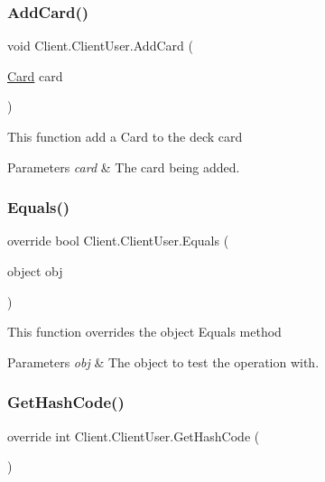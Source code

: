 \subsubsection{\texorpdfstring{Add\+Card()}{AddCard()}}
{\footnotesize\ttfamily void Client.\+Client\+User.\+Add\+Card (\begin{DoxyParamCaption}\item[{\hyperlink{class_game_1_1_card}{Card}}]{card }\end{DoxyParamCaption})\hspace{0.3cm}{\ttfamily [inline]}}

This function add a Card to the deck card 
\begin{DoxyParams}{Parameters}
{\em card} & The card being added. \\
\hline
\end{DoxyParams}
\mbox{\label{class_client_1_1_client_user_a515f5e58fe9f58abb63cfff6b9d399f1}} 
\subsubsection{\texorpdfstring{Equals()}{Equals()}}
{\footnotesize\ttfamily override bool Client.\+Client\+User.\+Equals (\begin{DoxyParamCaption}\item[{object}]{obj }\end{DoxyParamCaption})\hspace{0.3cm}{\ttfamily [inline]}}

This function overrides the object \textquotesingle{}Equals\textquotesingle{} method 
\begin{DoxyParams}{Parameters}
{\em obj} & The object to test the operation with. \\
\hline
\end{DoxyParams}
\mbox{\label{class_client_1_1_client_user_a1984c77d9a3444fdda847c6f8e4b1c93}} 
\subsubsection{\texorpdfstring{Get\+Hash\+Code()}{GetHashCode()}}
{\footnotesize\ttfamily override int Client.\+Client\+User.\+Get\+Hash\+Code (\begin{DoxyParamCaption}{ }\end{DoxyParamCaption})\hspace{0.3cm}{\ttfamily [inline]}}

